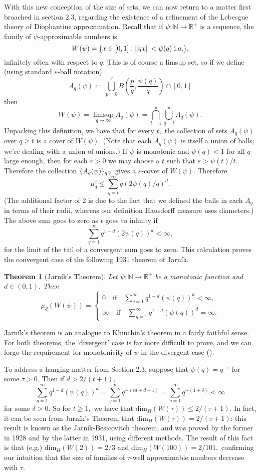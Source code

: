 \documentclass[12pt, letterpaper, oneside]{book}
\newcommand{\gd}{\ensuremath{\delta}}
\renewcommand{\ge}{\ensuremath{\varepsilon}}
\newcommand{\gt}{\ensuremath{\tau}}
\newcommand{\R}{\mathbb{R}}
\newcommand{\N}{\mathbb{N}}
\DeclarePairedDelimiter{\norm}{\lVert}{\rVert}
\DeclarePairedDelimiter{\set}{\lbrace}{\rbrace}
\theoremstyle{plain}
\newtheorem{theorem}{Theorem}
\theoremstyle{definition}
\theoremstyle{remark}
\begin{document}
With this new conception of the size of sets, we can now return to a matter first broached in section 2.3, regarding the existence of a refinement of the Lebesgue theory of Diophantine approximation. Recall that if $\psi: \N \to \R^+$ is a sequence, the family of $\psi$-approximable numbers is 
\[
W(\psi) = \set{x \in [0,1] : \norm{qx} < \psi(q) \; \mbox{i.o.}},
\]
infinitely often with respect to $q.$ This is of course a limsup set, so if we define (using standard $\ge$-ball notation)
\[
A_q(\psi) := \bigcup_{p = 0}^q B(\frac{p}{q},\frac{\psi(q)}{q})\cap [0,1]
\]
then 
\[
W(\psi) = \limsup \limits_{q \to \infty} A_q(\psi) = \bigcap_{t = 1}^\infty \bigcup_{q=t}^\infty A_q(\psi).
\]
Unpacking this definition, we have that for every $t,$ the collection of sets $A_q(\psi)$ over $q \geq t$ is a cover of $W(\psi).$ (Note that each $A_q(\psi)$ is itself a union of balls; we're dealing with a union of unions.) If $\psi$ is monotonic and $\psi(q) <1$ for all $q$ large enough, then for each $\ge > 0$ we may choose a $t$ such that $\ge > \psi(t)/t.$ Therefore the collection $\set{A_q(\psi)}_{q \geq }$ gives a $\ge$-cover of $W(\psi).$ Therefore
\[
\mu_d^{\ge} \leq \sum_{q = t}^{\infty}q(2\psi(q)/q)^d.
\]
(The additional factor of 2 is due to the fact that we defined the balls in each $A_q$ in terms of their radii, whereas our definition Hausdorff measure uses diameters.)
The above sum goes to zero as $t$ goes to infinity if
\[
\sum_{q=1}^{\infty} q^{1-d}(2\psi(q))^d < \infty,
\]
for the limit of the tail of a convergent sum goes to zero. This calculation proves the convergent case of the following 1931 theorem of Jarn{\'i}k.

\begin{theorem}[Jarn{\'i}k's Theorem]
Let $\psi: \N \to \R^+$ be a monotonic function and $d \in (0,1).$ Then
\[
\mu_d(W(\psi)) = 
\begin{cases}
0 \quad \mbox{if}\quad \sum_{q=1}^\infty q^{1-d}(\psi(q))^d < \infty,\\
\infty \quad \mbox{if} \quad \sum_{q=1}^\infty q^{1-d}(\psi(q))^d = \infty.
\end{cases}
\]
\end{theorem}
Jarn{\'i}k's theorem is an analogue to Khinchin's theorem in a fairly faithful sense. For both theorems, the `divergent' case is far more difficult to prove, and we can forgo the requirement for monotonicity of $\psi$ in the divergent case (\cite{BRV16}).

To address a hanging matter from Section 2.3, suppose that $\psi(q) = q^{-\gt}$ for some $\gt > 0.$ Then if $d > 2/(t+1),$
\[
\sum_{q=1}^\infty q^{1-d}(\psi(q))^d = \sum_{q=1}^\infty q^{-(td + d -1)} = \sum_{q=1}^\infty q^{-(1+\gd)} < \infty
\]
for some $\gd>0.$ So for $t \geq 1,$ we have that $\mbox{dim}_H(W(\gt)) \leq 2/(\gt  +1).$ In fact, it can be seen from Jarn{\'i}k's Theorem that $\mbox{dim}_H(W(\gt)) = 2/(\gt  +1)$: this result is known as the Jarn{\'i}k-Besicovitch theorem, and was proved by the former in 1928 and by the latter in 1931, using different methods. The result of this fact is that (e.g.) $\mbox{dim}_H(W(2)) = 2/3$ and $\mbox{dim}_H(W(100)) = 2/101,$ confirming our intuition that the size of families of $\gt$-well approximable numbers decrease with $\gt.$
\end{document}
